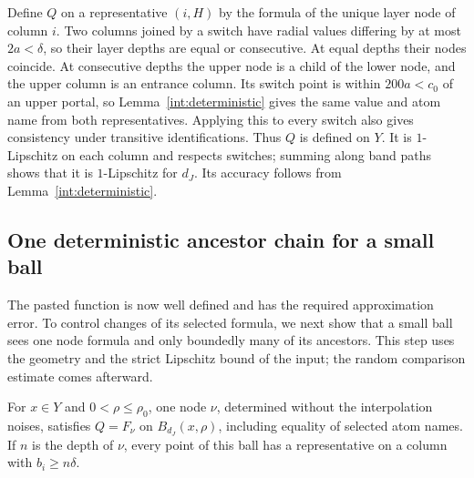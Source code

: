 Define $Q$ on a representative $(i,H)$ by the formula of the unique
layer node of column $i$.  Two columns joined by a switch have radial
values differing by at most $2a<\delta$, so their layer depths are
equal or consecutive.  At equal depths their nodes coincide.  At
consecutive depths the upper node is a child of the lower node, and
the upper column is an entrance column.  Its switch point is within
$200a<c_0$ of an upper portal, so Lemma~\ref{int:deterministic} gives
the same value and atom name from both representatives.  Applying this
to every switch also gives consistency under transitive identifications.
Thus $Q$ is defined on $Y$.  It is $1$-Lipschitz on each column and
respects switches; summing along band paths shows that it is
$1$-Lipschitz for $d_J$.  Its accuracy follows from
Lemma~\ref{int:deterministic}.

\subsection{One deterministic ancestor chain for a small ball}

The pasted function is now well defined and has the required approximation
error.  To control changes of its selected formula, we next show that a
small ball sees one node formula and only boundedly many of its ancestors.
This step uses the geometry and the strict Lipschitz bound of the input;
the random comparison estimate comes afterward.

\begin{lemma}\label{int:common-formula}
For $x\in Y$ and $0<\rho\le\rho_0$, one node $\nu$, determined
without the interpolation noises, satisfies $Q=F_\nu$ on
$B_{d_J}(x,\rho)$, including equality of selected atom names.
If $n$ is the depth of $\nu$, every point of this ball has a
representative on a column with $b_i\ge n\delta$.
\end{lemma}

